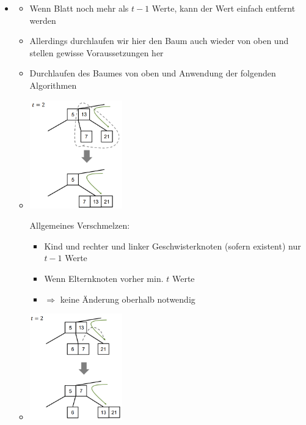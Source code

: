 \documentclass[
    12pt,
    a4paper,
    ngerman,
    color=3b,%
    marginpar=false,
    colorback=false,
    leqno,
]{tudaexercise}
\begin{document}
\begin{itemize}
        \item {}
            \begin{itemize}
                \item Wenn Blatt noch mehr als $t-1$ Werte, kann der Wert einfach entfernt werden
                \item Allerdings durchlaufen wir hier den Baum auch wieder von oben und stellen gewisse Voraussetzungen her
                \item Durchlaufen des Baumes von oben und Anwendung der folgenden Algorithmen
                \item[]
                    \begin{minipage}{0.25\textwidth}
                        \includegraphics[width=4cm]{pictures/bbaumMelt.PNG}
                    \end{minipage}
                    \begin{minipage}{0.65\textwidth}
                        Allgemeines Verschmelzen:
                        \begin{itemize}
                            \item Kind und rechter und linker Geschwisterknoten (sofern existent) nur $t-1$ Werte
                            \item Wenn Elternknoten vorher min. $t$ Werte
                            \item[] $\Rightarrow$ keine Änderung oberhalb notwendig
                        \end{itemize}
                    \end{minipage}
                \item[]
                    \begin{minipage}{0.25\textwidth}
                        \includegraphics[width=4cm]{pictures/bbaumRot.PNG}

\end{minipage}
\end{itemize}
\end{itemize}
\end{document}

